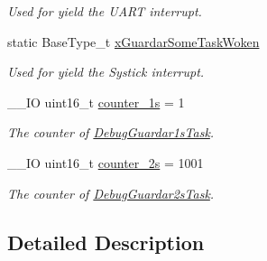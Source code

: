 \begin{DoxyCompactItemize}
\begin{DoxyCompactList}\small\item\em Used for yield the U\+A\+RT interrupt. \end{DoxyCompactList}\item 
static Base\+Type\+\_\+t \hyperlink{group___debug___private___variables_ga5ab62a235f978d6271ac56aa61c477dd}{x\+Guardar\+Some\+Task\+Woken}\hypertarget{group___debug___private___variables_ga5ab62a235f978d6271ac56aa61c477dd}{}\label{group___debug___private___variables_ga5ab62a235f978d6271ac56aa61c477dd}

\begin{DoxyCompactList}\small\item\em Used for yield the Systick interrupt. \end{DoxyCompactList}\item 
\+\_\+\+\_\+\+IO uint16\+\_\+t \hyperlink{group___debug___private___variables_ga141b0389ff1db82e53a437f466e70ed5}{counter\+\_\+1s} = 1\hypertarget{group___debug___private___variables_ga141b0389ff1db82e53a437f466e70ed5}{}\label{group___debug___private___variables_ga141b0389ff1db82e53a437f466e70ed5}

\begin{DoxyCompactList}\small\item\em The counter of \hyperlink{group___debug___exported___functions___group2_ga5e54537eed1694dae3ea8e6cce3f9b3a}{Debug\+Guardar1s\+Task}. \end{DoxyCompactList}\item 
\+\_\+\+\_\+\+IO uint16\+\_\+t \hyperlink{group___debug___private___variables_gace66769896763a0b6444579cc34c8aaf}{counter\+\_\+2s} = 1001\hypertarget{group___debug___private___variables_gace66769896763a0b6444579cc34c8aaf}{}\label{group___debug___private___variables_gace66769896763a0b6444579cc34c8aaf}

\begin{DoxyCompactList}\small\item\em The counter of \hyperlink{group___debug___exported___functions___group2_gadc8fe8277ada7992dddff220a145eb5f}{Debug\+Guardar2s\+Task}. \end{DoxyCompactList}\end{DoxyCompactItemize}


\subsection{Detailed Description}
